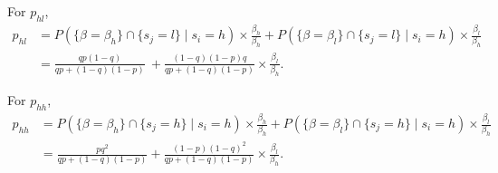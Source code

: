 \documentclass[12pt]{article}
\begin{document}
For \( p_{hl} \),
\begin{align*}
  p_{hl} &= P\left( \{\beta = \beta_h\} \cap \{s_j = l\} \mid s_i = h \right) \times \frac{\beta_h}{\beta_h}
+ P\left( \{\beta = \beta_l\} \cap \{s_j = l\} \mid s_i = h \right) \times \frac{\beta_l}{\beta_h} \\
&= \frac{qp(1-q)}{qp + (1-q)(1-p)} \
+ \frac{(1-q)(1-p)q}{qp + (1-q)(1-p)} \times \frac{\beta_l}{\beta_h}.
\end{align*}

For \( p_{hh} \),
\begin{align*}
p_{hh} &= P\left( \{\beta = \beta_h\} \cap \{s_j = h\} \mid s_i = h \right) \times \frac{\beta_h}{\beta_h}
+ P\left( \{\beta = \beta_l\} \cap \{s_j = h\} \mid s_i = h \right) \times \frac{\beta_l}{\beta_h} \\
&= \frac{pq^2}{qp + (1-q)(1-p)}
+ \frac{(1-p)(1-q)^2}{qp + (1-q)(1-p)} \times \frac{\beta_l}{\beta_h}.
\end{align*}
\end{document}
